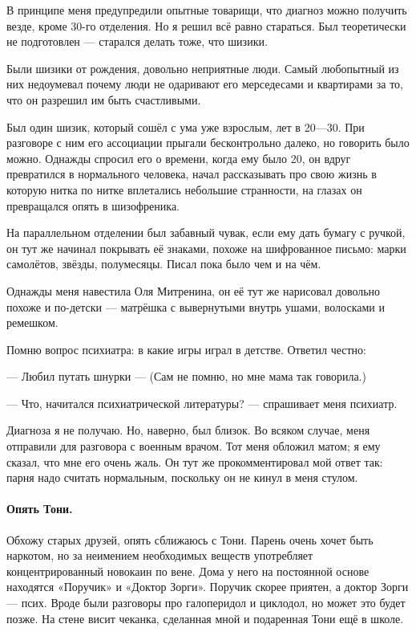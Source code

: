 \documentclass{book}
\begin{document}
В принципе меня предупредили опытные товарищи,
что диагноз можно получить везде, кроме 30-го отделения.
Но я решил всё равно стараться.
Был теоретически не подготовлен --- старался делать тоже, что шизики.

Были шизики от рождения,
довольно неприятные люди.
Самый любопытный из них недоумевал почему люди не одаривают его мерседесами и квартирами
за то, что он разрешил им быть счастливыми.

Был один шизик, который сошёл с ума уже взрослым, лет в 20---30.
При разговоре с ним его ассоциации прыгали бесконтрольно далеко, но говорить было можно.
Однажды спросил его о времени, когда ему было 20, он вдруг превратился в нормального человека, начал рассказывать про свою жизнь в которую  нитка по нитке вплетались небольшие странности, на глазах он превращался опять в шизофреника.

На параллельном отделении был забавный чувак, 
если ему дать бумагу с ручкой, он тут же начинал покрывать её знаками,
похоже на шифрованное письмо: марки самолётов, звёзды, полумесяцы.
Писал пока было чем и на чём.

Однажды меня навестила Оля Митренина, он её тут же нарисовал довольно похоже и по-детски --- матрёшка с вывернутыми внутрь ушами, волосками и ремешком.

Помню вопрос психиатра: в какие игры играл в детстве.
Ответил честно: 

--- Любил путать шнурки --- (Сам не помню, но мне мама так говорила.)

--- Что, начитался психиатрической литературы? --- спрашивает меня психиатр.

Диагноза я не получаю.
Но, наверно, был близок.
Во всяком случае, меня отправили для разговора с военным врачом.
Тот меня обложил матом; я ему сказал, что мне его очень жаль.
Он тут же прокомментировал мой ответ так:
парня надо считать нормальным, поскольку он не кинул в меня стулом.


\paragraph{Опять Тони.}
Обхожу старых друзей, опять сближаюсь с Тони.
Парень очень хочет быть наркотом, но за неимением необходимых веществ употребляет концентрированный новокаин по вене.
Дома у него на постоянной основе находятся «Поручик» и «Доктор Зорги».
Поручик скорее приятен, а доктор Зорги --- псих.
Вроде были разговоры про галоперидол и циклодол,
но может это будет позже.
На стене висит чеканка, сделанная мной и подаренная Тони ещё в школе.
\end{document}
